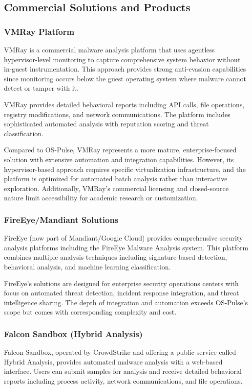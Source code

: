\subsection{Commercial Solutions and Products}

\subsubsection{VMRay Platform}
VMRay is a commercial malware analysis platform that uses agentless hypervisor-level monitoring to capture comprehensive system behavior without in-guest instrumentation. This approach provides strong anti-evasion capabilities since monitoring occurs below the guest operating system where malware cannot detect or tamper with it.

VMRay provides detailed behavioral reports including API calls, file operations, registry modifications, and network communications. The platform includes sophisticated automated analysis with reputation scoring and threat classification.

Compared to OS-Pulse, VMRay represents a more mature, enterprise-focused solution with extensive automation and integration capabilities. However, its hypervisor-based approach requires specific virtualization infrastructure, and the platform is optimized for automated batch analysis rather than interactive exploration. Additionally, VMRay's commercial licensing and closed-source nature limit accessibility for academic research or customization.

\subsubsection{FireEye/Mandiant Solutions}
FireEye (now part of Mandiant/Google Cloud) provides comprehensive security analysis platforms including the FireEye Malware Analysis system. This platform combines multiple analysis techniques including signature-based detection, behavioral analysis, and machine learning classification.

FireEye's solutions are designed for enterprise security operations centers with focus on automated threat detection, incident response integration, and threat intelligence sharing. The depth of integration and automation exceeds OS-Pulse's scope but comes with corresponding complexity and cost.

\subsubsection{Falcon Sandbox (Hybrid Analysis)}
Falcon Sandbox, operated by CrowdStrike and offering a public service called Hybrid Analysis, provides automated malware analysis with a web-based interface. Users can submit samples for analysis and receive detailed behavioral reports including process activity, network communications, and file operations.

